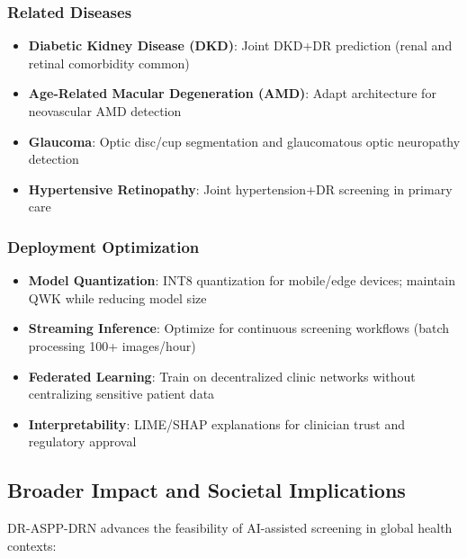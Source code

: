 \subsubsection{Related Diseases}

\begin{itemize}
    \item \textbf{Diabetic Kidney Disease (DKD)}: Joint DKD+DR prediction (renal and retinal comorbidity common)
    
    \item \textbf{Age-Related Macular Degeneration (AMD)}: Adapt architecture for neovascular AMD detection
    
    \item \textbf{Glaucoma}: Optic disc/cup segmentation and glaucomatous optic neuropathy detection
    
    \item \textbf{Hypertensive Retinopathy}: Joint hypertension+DR screening in primary care
\end{itemize}

\subsubsection{Deployment Optimization}

\begin{itemize}
    \item \textbf{Model Quantization}: INT8 quantization for mobile/edge devices; maintain QWK while reducing model size
    
    \item \textbf{Streaming Inference}: Optimize for continuous screening workflows (batch processing 100+ images/hour)
    
    \item \textbf{Federated Learning}: Train on decentralized clinic networks without centralizing sensitive patient data
    
    \item \textbf{Interpretability}: LIME/SHAP explanations for clinician trust and regulatory approval
\end{itemize}

\subsection{Broader Impact and Societal Implications}

DR-ASPP-DRN advances the feasibility of AI-assisted screening in global health contexts:

